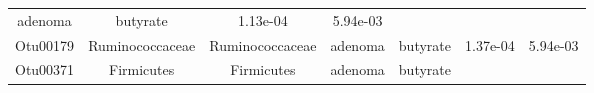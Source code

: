 \documentclass[11pt,]{article}
\begin{document}
\begin{longtable}[]{@{}ccccccc@{}}
\begin{minipage}[t]{0.09\columnwidth}
adenoma\strut
\end{minipage} & \begin{minipage}[t]{0.11\columnwidth}\centering\strut
butyrate\strut
\end{minipage} & \begin{minipage}[t]{0.09\columnwidth}\centering\strut
1.13e-04\strut
\end{minipage} & \begin{minipage}[t]{0.09\columnwidth}\centering\strut
5.94e-03\strut
\end{minipage}\tabularnewline
\begin{minipage}[t]{0.09\columnwidth}\centering\strut
Otu00179\strut
\end{minipage} & \begin{minipage}[t]{0.17\columnwidth}\centering\strut
Ruminococcaceae\strut
\end{minipage} & \begin{minipage}[t]{0.17\columnwidth}\centering\strut
Ruminococcaceae\strut
\end{minipage} & \begin{minipage}[t]{0.09\columnwidth}\centering\strut
adenoma\strut
\end{minipage} & \begin{minipage}[t]{0.11\columnwidth}\centering\strut
butyrate\strut
\end{minipage} & \begin{minipage}[t]{0.09\columnwidth}\centering\strut
1.37e-04\strut
\end{minipage} & \begin{minipage}[t]{0.09\columnwidth}\centering\strut
5.94e-03\strut
\end{minipage}\tabularnewline
\begin{minipage}[t]{0.09\columnwidth}\centering\strut
Otu00371\strut
\end{minipage} & \begin{minipage}[t]{0.17\columnwidth}\centering\strut
Firmicutes\strut
\end{minipage} & \begin{minipage}[t]{0.17\columnwidth}\centering\strut
Firmicutes\strut
\end{minipage} & \begin{minipage}[t]{0.09\columnwidth}\centering\strut
adenoma\strut
\end{minipage} & \begin{minipage}[t]{0.11\columnwidth}\centering\strut
butyrate\strut
\end{minipage} & \begin{minipage}[t]{0.09\columnwidth}\centering\strut

\end{minipage}
\end{longtable}
\end{document}
